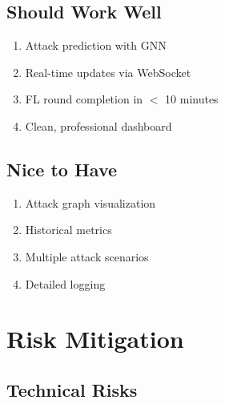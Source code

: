 \documentclass[12pt,a4paper]{article}
\begin{document}
\subsection{Should Work Well}

\begin{enumerate}[leftmargin=1cm,itemsep=0pt]
    \item Attack prediction with GNN
    \item Real-time updates via WebSocket
    \item FL round completion in $<$ 10 minutes
    \item Clean, professional dashboard
\end{enumerate}

\subsection{Nice to Have}

\begin{enumerate}[leftmargin=1cm,itemsep=0pt]
    \item Attack graph visualization
    \item Historical metrics
    \item Multiple attack scenarios
    \item Detailed logging
\end{enumerate}


\section{Risk Mitigation}

\subsection{Technical Risks}
\end{document}
